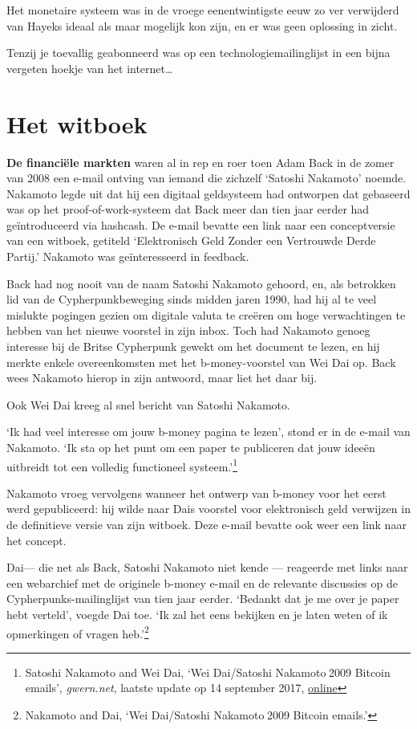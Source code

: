 \documentclass[smalldemyvopaper,11pt,twoside,onecolumn,openright,extrafontsizes,hidelinks]{memoir}
\begin{document}
Het monetaire systeem was in de vroege eenentwintigste eeuw zo ver
verwijderd van Hayeks ideaal als maar mogelijk kon zijn, en er was geen
oplossing in zicht.

Tenzij je toevallig geabonneerd was op een technologiemailinglijst in
een bijna vergeten hoekje van het internet\ldots{}

\chapter{Het witboek}\label{het-witboek}

\textbf{De financiële markten} waren al in rep en roer toen Adam Back in
de zomer van 2008 een e-mail ontving van iemand die zichzelf `Satoshi
Nakamoto' noemde. Nakamoto legde uit dat hij een digitaal geldsysteem
had ontworpen dat gebaseerd was op het proof-of-work-systeem dat Back
meer dan tien jaar eerder had geïntroduceerd via hashcash. De e-mail
bevatte een link naar een conceptversie van een witboek, getiteld
`Elektronisch Geld Zonder een Vertrouwde Derde Partij.' Nakamoto was
geïnteresseerd in feedback.

Back had nog nooit van de naam Satoshi Nakamoto gehoord, en, als
betrokken lid van de Cypherpunkbeweging sinds midden jaren 1990, had hij
al te veel mislukte pogingen gezien om digitale valuta te creëren om
hoge verwachtingen te hebben van het nieuwe voorstel in zijn inbox. Toch
had Nakamoto genoeg interesse bij de Britse Cypherpunk gewekt om het
document te lezen, en hij merkte enkele overeenkomsten met het
b-money-voorstel van Wei Dai op. Back wees Nakamoto hierop in zijn
antwoord, maar liet het daar bij.

Ook Wei Dai kreeg al snel bericht van Satoshi Nakamoto.

`Ik had veel interesse om jouw b-money pagina te lezen', stond er in de
e-mail van Nakamoto. `Ik sta op het punt om een paper te publiceren dat
jouw ideeën uitbreidt tot een volledig functioneel systeem.'\footnote{Satoshi
  Nakamoto and Wei Dai, `Wei Dai/Satoshi Nakamoto 2009 Bitcoin emails',
  \emph{gwern.net}, laatste update op 14 september 2017,
  \href{https://gwern.net/doc/bitcoin/2008-nakamoto}{online}}

Nakamoto vroeg vervolgens wanneer het ontwerp van b-money voor het eerst
werd gepubliceerd: hij wilde naar Dais voorstel voor elektronisch geld
verwijzen in de definitieve versie van zijn witboek. Deze e-mail bevatte
ook weer een link naar het concept.

Dai--- die net als Back, Satoshi Nakamoto niet kende --- reageerde met
links naar een webarchief met de originele b-money e-mail en de
relevante discussies op de Cypherpunks-mailinglijst van tien jaar
eerder. `Bedankt dat je me over je paper hebt verteld', voegde Dai toe.
`Ik zal het eens bekijken en je laten weten of ik opmerkingen of vragen
heb.'\footnote{Nakamoto and Dai, `Wei Dai/Satoshi Nakamoto 2009 Bitcoin
  emails.'}
\end{document}
